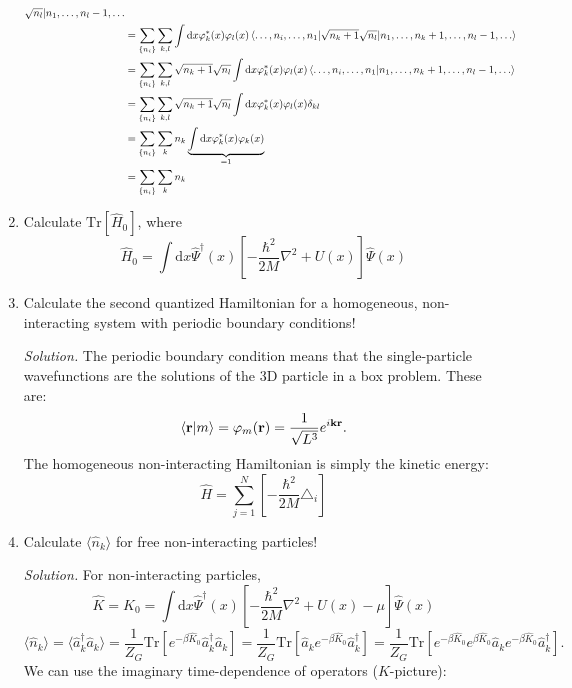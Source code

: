 \documentclass[11pt, a4paper]{article}
\newcommand{\dd}{\mathrm{d}}
\newcommand{\Tr}[1]{\mathrm{Tr}\left[#1\right]}
\begin{document}
\begin{enumerate}
\begin{align*}
{        \sqrt{n_l} |n_1, \dots, n_l-1, \dots} \\
        & = \sum\limits_{\{n_i\}}\sum\limits_{k,l}\int\dd x \varphi^*_k(x)\varphi_l(x) \braket{\dots,n_i,\dots,n_1 | 
        \sqrt{n_k+1}\sqrt{n_l} |n_1, \dots, n_k+1, \dots, n_l-1, \dots} \\
        & = \sum\limits_{\{n_i\}}\sum\limits_{k,l} \sqrt{n_k+1}\sqrt{n_l} \int\dd x \varphi^*_k(x)\varphi_l(x) \braket{\dots,n_i,\dots,n_1 |n_1, \dots, n_k+1, \dots, n_l-1, \dots} \\
        & = \sum\limits_{\{n_i\}}\sum\limits_{k,l} \sqrt{n_k+1}\sqrt{n_l} \int\dd x \varphi^*_k(x)\varphi_l(x) \delta_{kl} \\
        & = \sum\limits_{\{n_i\}}\sum\limits_{k} n_k \underbrace{\int\dd x \varphi^*_k(x)\varphi_k(x)}_{=1}\\
        & = \sum\limits_{\{n_i\}}\sum\limits_{k} n_k
    \end{align*}
    \item Calculate $\Tr {\hat H_0}$, where
    \begin{equation*}
        \hat H_0 = \int\dd x \hat\Psi^{\dagger}(x)\left[ -\frac{\hbar^2}{2M}\nabla^2 + U(x) \right]\hat\Psi(x)
    \end{equation*}
    \item Calculate the second quantized Hamiltonian for a homogeneous, non-interacting system with periodic boundary conditions!
    \par \textit{Solution.}
    The periodic boundary condition means that the single-particle wavefunctions are the solutions of the 3D particle in a box problem.
    These are:
    \begin{equation*}
        \braket{\mathbf r | m} = \varphi_m(\mathbf r) = \frac{1}{\sqrt{L^3}}e^{i\mathbf k \mathbf r}.
    \end{equation*}
    The homogeneous non-interacting Hamiltonian is simply the kinetic energy:
    \begin{equation*}
        \hat H = \sum_{j=1}^N\left[-\frac{\hbar^2}{2M}\triangle_i\right] 
    \end{equation*}
    \item Calculate $\langle \hat n_k \rangle$ for free non-interacting particles!
    \par \textit{Solution.}
    For non-interacting particles,
    \begin{equation*}
        \hat K = \hat K_0 = \int\dd x \hat\Psi^{\dagger}(x)\left[ -\frac{\hbar^2}{2M}\nabla^2 + U(x) - \mu \right]\hat\Psi(x)
    \end{equation*}
    \begin{equation*}
        \langle \hat n_k \rangle = \langle \hat a_k^{\dagger}\hat a_k \rangle
        = \frac{1}{Z_G}\Tr{e^{-\beta \hat K_0}\hat a_k^{\dagger}\hat a_k} 
        = \frac{1}{Z_G}\Tr{\hat a_ke^{-\beta \hat K_0}\hat a_k^{\dagger}}
        = \frac{1}{Z_G}\Tr{e^{-\beta \hat K_0}e^{\beta \hat K_0}\hat a_ke^{-\beta \hat K_0}\hat a_k^{\dagger}}.
    \end{equation*}
    We can use the imaginary time-dependence of operators ($K$-picture):
    


\end{enumerate}
\end{document}
